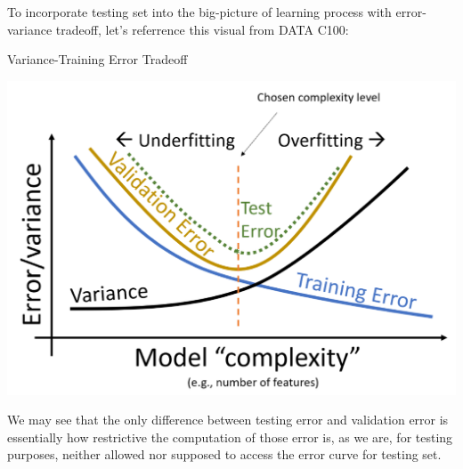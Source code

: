 To incorporate testing set into the big-picture of learning process with error-variance tradeoff, let's referrence this visual from DATA C100:
\begin{ln-fig}{Variance-Training Error Tradeoff}{}
    \begin{center}
        \includegraphics[scale=0.4]{figs/ln06/var-test-err-tradeoff.png}
    \end{center}
\end{ln-fig}
We may see that the only difference between testing error and validation error is essentially how restrictive the computation of those error is, as we are, for testing purposes, neither allowed nor supposed to access the error curve for testing set.

